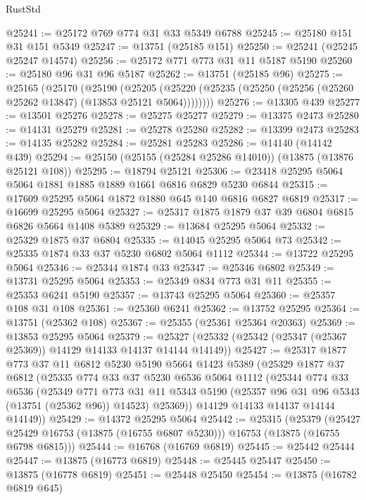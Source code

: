 \begin{lexlean}{RustStd}
\begin{coremodule}
@25241 := @25172 @769 @774 @31 @33 @5349 @6788
@25245 := @25180 @151 @31 @151 @5349
@25247 := @13751 (@25185 @151)
@25250 := @25241 (@25245 @25247 @14574)
@25256 := @25172 @771 @773 @31 @11 @5187 @5190
@25260 := @25180 @96 @31 @96 @5187
@25262 := @13751 (@25185 @96)
@25275 := @25165
    (@25170
      (@25190
        (@25205 (@25220 (@25235 (@25250 (@25256 (@25260 @25262 @13847) (@13853 @25121 @5064))))))))
@25276 := @13305 @439
@25277 := @13501 @25276
@25278 := @25275 @25277
@25279 := @13375 @2473
@25280 := @14131 @25279
@25281 := @25278 @25280
@25282 := @13399 @2473
@25283 := @14135 @25282
@25284 := @25281 @25283
@25286 := @14140 (@14142 @439)
@25294 := @25150 (@25155 (@25284 @25286 @14010)) (@13875 (@13876 @25121 @108))
@25295 := @18794 @25121
@25306 := @23418 @25295 @5064 @5064 @1881 @1885 @1889 @1661 @6816 @6829 @5230 @6844
@25315 := @17609 @25295 @5064 @1872 @1880 @645 @140 @6816 @6827 @6819
@25317 := @16699 @25295 @5064
@25327 := @25317 @1875 @1879 @37 @39 @6804 @6815 @6826 @5664 @1408 @5389
@25329 := @13684 @25295 @5064
@25332 := @25329 @1875 @37 @6804
@25335 := @14045 @25295 @5064 @73
@25342 := @25335 @1874 @33 @37 @5230 @6802 @5064 @1112
@25344 := @13722 @25295 @5064
@25346 := @25344 @1874 @33
@25347 := @25346 @6802
@25349 := @13731 @25295 @5064
@25353 := @25349 @834 @773 @31 @11
@25355 := @25353 @6241 @5190
@25357 := @13743 @25295 @5064
@25360 := @25357 @108 @31 @108
@25361 := @25360 @6241
@25362 := @13752 @25295
@25364 := @13751 (@25362 @108)
@25367 := @25355 (@25361 @25364 @20363)
@25369 := @13853 @25295 @5064
@25379 := @25327 (@25332 (@25342 (@25347 (@25367 @25369)) @14129 @14133 @14137 @14144 @14149))
@25427 := @25317
    @1877
    @773
    @37
    @11
    @6812
    @5230
    @5190
    @5664
    @1423
    @5389
    (@25329
      @1877
      @37
      @6812
      (@25335
        @774
        @33
        @37
        @5230
        @6536
        @5064
        @1112
        (@25344
          @774
          @33
          @6536
          (@25349
            @771
            @773
            @31
            @11
            @5343
            @5190
            (@25357 @96 @31 @96 @5343 (@13751 (@25362 @96)) @14523)
            @25369))
        @14129
        @14133
        @14137
        @14144
        @14149))
@25429 := @14372 @25295 @5064
@25442 := @25315
    (@25379
      (@25427 @25429 @16753 (@13875 (@16755 @6807 @5230)))
      @16753
      (@13875 (@16755 @6798 @6815)))
@25444 := @16768 (@16769 @6819)
@25445 := @25442 @25444
@25447 := @13875 (@16773 @6819)
@25448 := @25445 @25447
@25450 := @13875 (@16778 @6819)
@25451 := @25448 @25450
@25454 := @13875 (@16782 @6819 @645)

\end{coremodule}
\end{lexlean}
